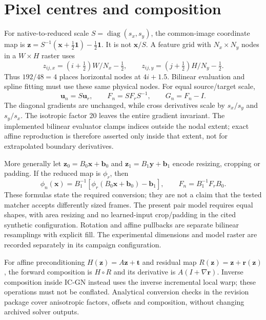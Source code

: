 \section{Pixel centres and composition}\label{sec:coordinates}
For native-to-reduced scale $S=\operatorname{diag}(s_x,s_y)$, the common-image coordinate map is $\mathbf z=S^{-1}(\mathbf x+\tfrac12\mathbf1)-\tfrac12\mathbf1$. It is not $\mathbf x/S$. A feature grid with $N_x\times N_y$ nodes in a $W\times H$ raster uses
\begin{equation}
z_{ij,x}=(i+\tfrac12)W/N_x-\tfrac12,\qquad
z_{ij,y}=(j+\tfrac12)H/N_y-\tfrac12.
\end{equation}
Thus $192/48=4$ places horizontal nodes at $4i+1.5$. Bilinear evaluation and spline fitting must use these same physical nodes. For equal source/target scale,
\begin{equation}
\mathbf u_n=S\mathbf u_r,\qquad F_n=SF_rS^{-1},\qquad G_n=F_n-I.
\end{equation}
The diagonal gradients are unchanged, while cross derivatives scale by $s_x/s_y$ and $s_y/s_x$. The isotropic factor 20 leaves the entire gradient invariant. The implemented bilinear evaluator clamps indices outside the nodal extent; exact affine reproduction is therefore asserted only inside that extent, not for extrapolated boundary derivatives.

More generally let $\mathbf z_0=B_0\mathbf x+\mathbf b_0$ and $\mathbf z_1=B_1\mathbf y+\mathbf b_1$ encode resizing, cropping or padding. If the reduced map is $\phi_r$, then
\begin{equation}
\phi_n(\mathbf x)=B_1^{-1}[\phi_r(B_0\mathbf x+\mathbf b_0)-\mathbf b_1],\qquad
F_n=B_1^{-1}F_r B_0.
\end{equation}
These formulas state the required conversion; they are not a claim that the tested matcher accepts differently sized frames. The present pair model requires equal shapes, with area resizing and no learned-input crop/padding in the cited synthetic configuration. Rotation and affine pullbacks are separate bilinear resamplings with explicit fill. The experimental dimensions and model raster are recorded separately in its campaign configuration.

For affine preconditioning $H(\mathbf z)=A\mathbf z+\mathbf t$ and residual map $R(\mathbf z)=\mathbf z+\mathbf r(\mathbf z)$, the forward composition is $H\circ R$ and its derivative is $A(I+\nabla\mathbf r)$. Inverse composition inside IC-GN instead uses the inverse incremental local warp; these operations must not be conflated. Analytical conversion checks in the revision package cover anisotropic factors, offsets and composition, without changing archived solver outputs.
